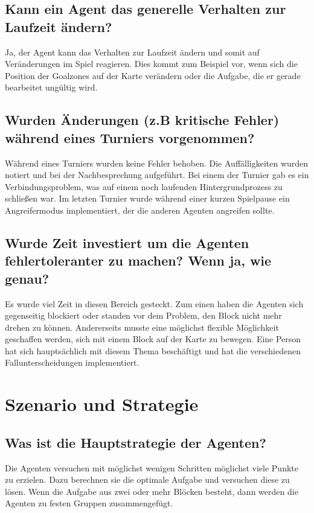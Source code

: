 \subsection{Kann ein Agent das generelle Verhalten zur Laufzeit ändern?}
Ja, der Agent kann das Verhalten zur Laufzeit ändern und somit auf Veränderungen im Spiel reagieren. Dies kommt zum Beispiel vor, wenn sich die Position der Goalzones auf der Karte verändern oder die Aufgabe, die er gerade bearbeitet ungültig wird.

\subsection{Wurden Änderungen (z.B kritische Fehler) während eines Turniers vorgenommen?}
Während eines Turniers wurden keine Fehler behoben. Die Auffälligkeiten wurden notiert und bei der Nachbesprechung aufgeführt. Bei einem der Turnier gab es ein Verbindungsproblem, was auf einem noch laufenden Hintergrundprozess zu schließen war.
Im letzten Turnier wurde während einer kurzen Spielpause ein \glqq{}Angreifermodus\grqq{} implementiert, der die anderen Agenten angreifen sollte.

\subsection{Wurde Zeit investiert um die Agenten fehlertoleranter zu machen? Wenn ja, wie genau?}
Es wurde viel Zeit in diesen Bereich gesteckt. Zum einen haben die Agenten sich gegenseitig blockiert oder standen vor dem Problem, den Block nicht mehr drehen zu können. Andererseits musste eine möglichst flexible Möglichkeit geschaffen werden, sich mit einem Block auf der Karte zu bewegen. Eine Person hat sich hauptsächlich mit diesem Thema beschäftigt und hat die verschiedenen Fallunterscheidungen implementiert.

\section{Szenario und Strategie}
\subsection{Was ist die Hauptstrategie der Agenten?}
Die Agenten versuchen mit möglichst wenigen Schritten möglichst viele Punkte zu erzielen. Dazu berechnen sie die optimale Aufgabe und versuchen diese zu lösen. Wenn die Aufgabe aus zwei oder mehr Blöcken besteht, dann werden die Agenten zu festen Gruppen zusammengefügt.

